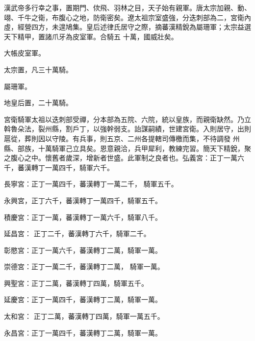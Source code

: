 
\begin{pinyinscope}

 漢武帝多行幸之事，置期門、佽飛、羽林之目，天子始有親軍。唐太宗加親、動、翊、千牛之衛，布腹心之地，防衛密矣。遼太祖宗室盛強，分迭刺部為二，宮衛內虛，經營四方，未遑鳩集。皇后述律氏居守之際，摘蕃漢精銳為屬珊軍；太宗益選天下精甲，置諸爪牙為皮室軍。合騎五
 十萬，國威壯矣。



 大帳皮室軍。



 太宗置，凡三十萬騎。



 屬珊軍。



 地皇后置，二十萬騎。



 宮衛騎軍太祖以迭刺部受禪，分本部為五院、六院，統以皇族，而親衛缺然。乃立斡魯朵法，裂州縣，割戶丁，以強幹弱支。詒謀嗣績，世建宮衛。入則居守，出則扈從，葬則因以守陵。有兵事，則五京、二州各提轄司傳檄而集，不待調發
 州縣、部族，十萬騎軍己立具矣。恩意親洽，兵甲犀利，教練完習。簡天下精銳，聚之腹心之中。懷舊者歲深，增新者世盛。此軍制之良者也。弘義宮：正丁一萬六千，蕃漢轉丁一萬四千，騎軍六千。



 長寧宮：正丁一萬四千，蕃漢轉丁一萬二千，
 騎軍五千。



 永興宮，正丁六千，蕃漢轉丁一萬四千，騎軍五千。



 積慶宮：正丁一萬，蕃漢轉丁一萬六千，騎軍八千。



 延昌宮：
 正丁二千，蕃漢轉丁六千，騎軍二千。



 彰愍宮：正丁一萬六千，蕃漢轉丁二萬，騎軍一萬。



 崇德宮：正丁一萬二千，蕃漢轉丁二萬，
 騎軍一萬。



 興聖宮：正丁二萬，蕃漢轉丁四萬，騎軍五千。



 延慶宮：正丁一萬四千，蕃漢轉丁二萬，騎軍一萬。



 太和宮：
 正丁二萬，蕃漢轉丁四萬，騎軍一萬五千。



 永昌宮：正丁一萬四千，蕃漢轉丁二萬，騎軍一萬。




\end{pinyinscope}
